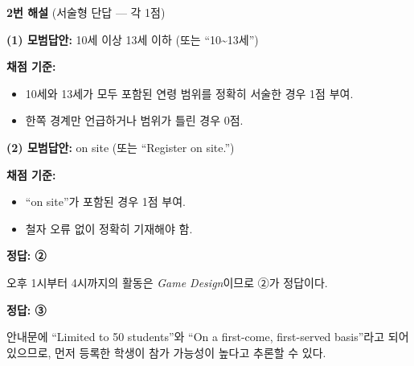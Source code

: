 \documentclass[11pt,a4paper]{article}
\begin{document}
\vspace{10pt}

{\sffamily\bfseries 2번 해설} (서술형 단답 — 각 1점)

\vspace{6pt}
\noindent \textbf{(1) 모범답안:} 10세 이상 13세 이하 (또는 ``10\textasciitilde{}13세'')

\vspace{3pt}
\noindent \textbf{채점 기준:}
\begin{itemize}[leftmargin=2em,itemsep=1pt,topsep=2pt,parsep=0pt]
  \item 10세와 13세가 모두 포함된 연령 범위를 정확히 서술한 경우 1점 부여.
  \item 한쪽 경계만 언급하거나 범위가 틀린 경우 0점.
\end{itemize}

\vspace{6pt}
\noindent \textbf{(2) 모범답안:} on site (또는 ``Register on site.'')

\vspace{3pt}
\noindent \textbf{채점 기준:}
\begin{itemize}[leftmargin=2em,itemsep=1pt,topsep=2pt,parsep=0pt]
  \item ``on site''가 포함된 경우 1점 부여.
  \item 철자 오류 없이 정확히 기재해야 함.
\end{itemize}

\vspace{10pt}
 \quad \textbf{정답: ②}
\par 오후 1시부터 4시까지의 활동은 \textit{Game Design}이므로 ②가 정답이다.

\vspace{8pt}
 \quad \textbf{정답: ③}
\par 안내문에 ``Limited to 50 students''와 ``On a first-come, first-served basis''라고 되어 있으므로, 먼저 등록한 학생이 참가 가능성이 높다고 추론할 수 있다.
\end{document}
